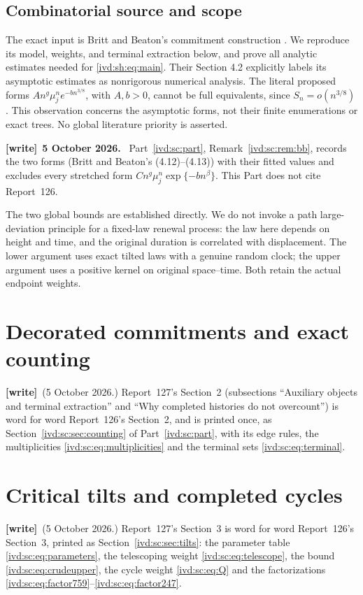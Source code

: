 \documentclass[11pt,letterpaper]{article}
\theoremstyle{remark}\newtheorem{remark}[theorem]{Remark}
\numberwithin{equation}{section}
\newenvironment{writenote}[1][]{\par\smallskip\begingroup\small
 \noindent\textbf{[write]}\if\relax\detokenize{#1}\relax\else~\textbf{#1.}\fi\ }%
 {\par\endgroup\smallskip}
\newcommand{\wtag}{\textup{\textbf{[write]}}}
\begin{document}
\subsection{Combinatorial source and scope}\label{ivd:sh:sub:scope}
The exact input is Britt and Beaton's commitment construction
\cite[Sections 3.8--3.9, Lemmas 5--6 and Appendix A]{BB}.
We reproduce its model, weights, and terminal extraction below, and
prove all analytic estimates needed for \eqref{ivd:sh:eq:main}.
Their Section 4.2 explicitly labels its asymptotic estimates as
nonrigorous numerical analysis. The literal proposed forms
$A n^g\mu_j^n e^{-b n^{3/8}}$, with $A,b>0$, cannot be full
equivalents, since $S_n=o(n^{3/8})$. This observation concerns the
asymptotic forms, not their finite enumerations or exact trees.
No global literature priority is asserted.
\begin{writenote}[5 October 2026]
Part~\ref{ivd:sc:part}, Remark~\ref{ivd:sc:rem:bb}, records the two forms (Britt and Beaton's (4.12)--(4.13)) with their fitted values and excludes every stretched form $Cn^g\mu_j^n\exp\{-bn^\beta\}$. This Part does not cite Report~126.
\end{writenote}

The two global bounds are established directly. We do not invoke a
path large-deviation principle for a fixed-law renewal process: the
law here depends on height and time, and the original duration is
correlated with displacement. The lower argument uses exact tilted
laws with a genuine random clock; the upper argument uses a positive
kernel on original space--time. Both retain the actual endpoint weights.
\section{Decorated commitments and exact counting}\label{ivd:sh:sec:counting}
\wtag\ (5 October 2026.) Report~127's Section~2 (subsections ``Auxiliary objects and terminal extraction'' and ``Why completed histories do not overcount'') is word for word Report~126's Section~2, and is printed once, as Section~\ref{ivd:sc:sec:counting} of Part~\ref{ivd:sc:part}, with its edge rules, the multiplicities \eqref{ivd:sc:eq:multiplicities} and the terminal sets \eqref{ivd:sc:eq:terminal}.

\section{Critical tilts and completed cycles}\label{ivd:sh:sec:tilts}
\wtag\ (5 October 2026.) Report~127's Section~3 is word for word Report~126's Section~3, printed as Section~\ref{ivd:sc:sec:tilts}: the parameter table \eqref{ivd:sc:eq:parameters}, the telescoping weight \eqref{ivd:sc:eq:telescope}, the bound \eqref{ivd:sc:eq:crudeupper}, the cycle weight \eqref{ivd:sc:eq:Q} and the factorizations \eqref{ivd:sc:eq:factor759}--\eqref{ivd:sc:eq:factor247}.
\end{document}
